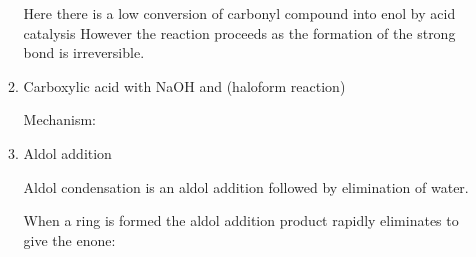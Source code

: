 \begin{enumerate}[label=\alph*)]
\begin{enumerate}[label=\roman*)]
        Here there is a low conversion of carbonyl compound into enol by
        acid catalysis However the reaction proceeds as the formation of
        the strong  bond is irreversible.

      \item Carboxylic acid with NaOH and  (haloform reaction)


        Mechanism:


      \item Aldol addition


        Aldol condensation is an aldol addition followed by elimination of water.


        When a ring is formed the aldol addition product rapidly eliminates
        to give the enone:


    \end{enumerate}

\end{enumerate}